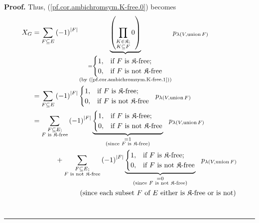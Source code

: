 \documentclass[numbers=enddot,12pt,final,onecolumn,notitlepage]{scrartcl}%
\theoremstyle{definition}
\newenvironment{proof}[1][Proof]{\noindent\textbf{#1.} }{\ \rule{0.5em}{0.5em}}
\newenvironment{verlong}{}{}
\let\sumnonlimits\sum
\let\prodnonlimits\prod
\renewcommand{\sum}{\sumnonlimits\limits}
\renewcommand{\prod}{\prodnonlimits\limits}
\begin{document}
\begin{verlong}
\begin{proof}
Thus, (\ref{pf.cor.ambichromsym.K-free.0}) becomes%
\begin{align*}
X_{G}  &  =\sum_{F\subseteq E}\left(  -1\right)  ^{\left\vert F\right\vert
}\underbrace{\left(  \prod_{\substack{K\in\mathfrak{K};\\K\subseteq
F}}0\right)  }_{\substack{=%
\begin{cases}
1, & \text{if }F\text{ is }\mathfrak{K}\text{-free;}\\
0, & \text{if }F\text{ is not }\mathfrak{K}\text{-free}%
\end{cases}
\\\text{(by (\ref{pf.cor.ambichromsym.K-free.1}))}}}p_{\lambda\left(
V,\operatorname*{union}F\right)  }\\
&  =\sum_{F\subseteq E}\left(  -1\right)  ^{\left\vert F\right\vert }%
\begin{cases}
1, & \text{if }F\text{ is }\mathfrak{K}\text{-free;}\\
0, & \text{if }F\text{ is not }\mathfrak{K}\text{-free}%
\end{cases}
\ \ p_{\lambda\left(  V,\operatorname*{union}F\right)  }\\
&  =\sum_{\substack{F\subseteq E;\\F\text{ is }\mathfrak{K}\text{-free}%
}}\left(  -1\right)  ^{\left\vert F\right\vert }\underbrace{%
\begin{cases}
1, & \text{if }F\text{ is }\mathfrak{K}\text{-free;}\\
0, & \text{if }F\text{ is not }\mathfrak{K}\text{-free}%
\end{cases}
}_{\substack{=1\\\text{(since }F\text{ is }\mathfrak{K}\text{-free)}%
}}\ \ p_{\lambda\left(  V,\operatorname*{union}F\right)  }\\
&  \ \ \ \ \ \ \ \ \ \ +\sum_{\substack{F\subseteq E;\\F\text{ is not
}\mathfrak{K}\text{-free}}}\left(  -1\right)  ^{\left\vert F\right\vert
}\underbrace{%
\begin{cases}
1, & \text{if }F\text{ is }\mathfrak{K}\text{-free;}\\
0, & \text{if }F\text{ is not }\mathfrak{K}\text{-free}%
\end{cases}
}_{\substack{=0\\\text{(since }F\text{ is not }\mathfrak{K}\text{-free)}%
}}\ \ p_{\lambda\left(  V,\operatorname*{union}F\right)  }\\
&  \ \ \ \ \ \ \ \ \ \ \ \ \ \ \ \ \ \ \ \ \left(  \text{since each subset
}F\text{ of }E\text{ either is }\mathfrak{K}\text{-free or is not}\right) \\

\end{align*}
\end{proof}
\end{verlong}
\end{document}
